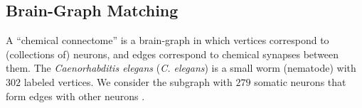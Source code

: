 \documentclass[11pt]{article}
\providecommand{\mh}[1]{\hat{#1}}
\newcommand{\FAQ}{\texttt{FAQ} }
\begin{document}



% 



\subsection{Brain-Graph Matching} %
\label{sub:connectome_classification}

A ``chemical connectome'' is a brain-graph in which vertices correspond to (collections of) neurons, and edges correspond to chemical synapses between them. The \emph{Caenorhabditis elegans} (\emph{C. elegans}) is a small worm (nematode) with $302$ labeled vertices.  We consider the subgraph with $279$ somatic neurons that form edges with other neurons \cite{WhiteBrenner86, Varshney2011}.  
\end{document}
